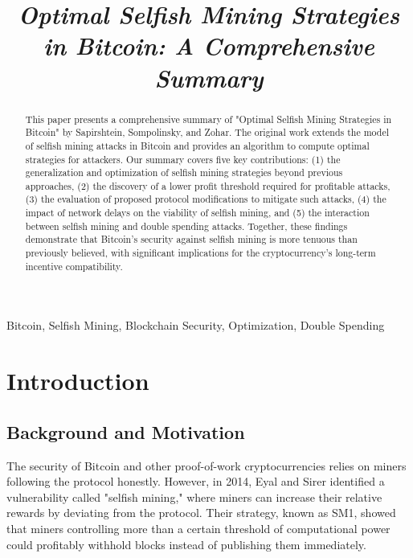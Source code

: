 \documentclass[conference]{IEEEtran}
\begin{document}
\title{\textit{Optimal Selfish Mining Strategies in Bitcoin: A Comprehensive Summary}\\
}

\author{
}

\maketitle
\begin{abstract}
    This paper presents a comprehensive summary of "Optimal Selfish Mining Strategies in Bitcoin" by Sapirshtein, Sompolinsky, and Zohar. The original work extends the model of selfish mining attacks in Bitcoin and provides an algorithm to compute optimal strategies for attackers. Our summary covers five key contributions: (1) the generalization and optimization of selfish mining strategies beyond previous approaches, (2) the discovery of a lower profit threshold required for profitable attacks, (3) the evaluation of proposed protocol modifications to mitigate such attacks, (4) the impact of network delays on the viability of selfish mining, and (5) the interaction between selfish mining and double spending attacks. Together, these findings demonstrate that Bitcoin's security against selfish mining is more tenuous than previously believed, with significant implications for the cryptocurrency's long-term incentive compatibility.
\end{abstract}

\begin{IEEEkeywords}
    Bitcoin, Selfish Mining, Blockchain Security, Optimization, Double Spending
\end{IEEEkeywords}

\section{Introduction}

\subsection{Background and Motivation}

The security of Bitcoin and other proof-of-work cryptocurrencies relies on miners following the protocol honestly. However, in 2014, Eyal and Sirer identified a vulnerability called "selfish mining," where miners can increase their relative rewards by deviating from the protocol. Their strategy, known as SM1, showed that miners controlling more than a certain threshold of computational power could profitably withhold blocks instead of publishing them immediately.
\end{document}
